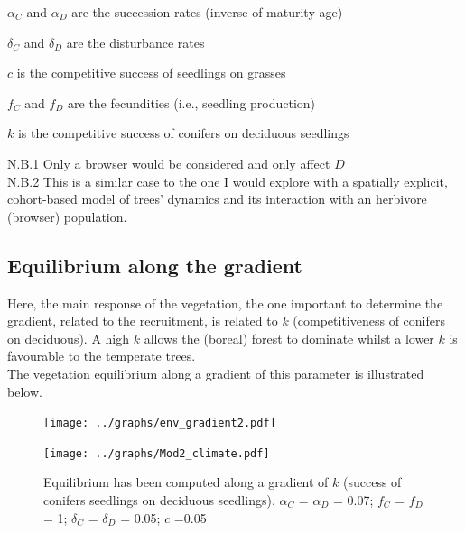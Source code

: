 $\alpha_C$ and $\alpha_D$ are the succession rates (inverse of maturity age)

$\delta_C$ and $\delta_D$ are the disturbance rates

$c$ is the competitive success of seedlings on grasses

$f_C$ and $f_D$ are the fecundities (i.e., seedling production)

$k$ is the competitive success of conifers on deciduous seedlings

\vspace{1em}

N.B.1 Only a browser would be considered and only affect $D$\\

N.B.2 This is a similar case to the one I would explore with a spatially
explicit, cohort-based model of trees' dynamics and its interaction with an
herbivore (browser) population.

\newpage
\subsection*{Equilibrium along the gradient}

Here, the main response of the vegetation, the one important to determine the
gradient, related to the recruitment, is related to $k$ (competitiveness of
conifers on deciduous). A high $k$ allows the (boreal) forest to dominate
whilst a lower $k$ is favourable to the temperate trees. \\ The vegetation
equilibrium along a gradient of this parameter is illustrated below.

\begin{figure}[!h]

   \texttt{[image: ../graphs/env\_gradient2.pdf]}

\end{figure}

\begin{figure}

   \texttt{[image: ../graphs/Mod2\_climate.pdf]}

   \caption{Equilibrium has been computed along a gradient of $k$ (success of
conifers seedlings on deciduous seedlings). $\alpha_C$ = $\alpha_D$ = 0.07;
$f_C$ = $f_D$ = 1; $\delta_C$ = $\delta_D$ = 0.05; $c$ =0.05}
\label{mod2Climate} 
\end{figure}




